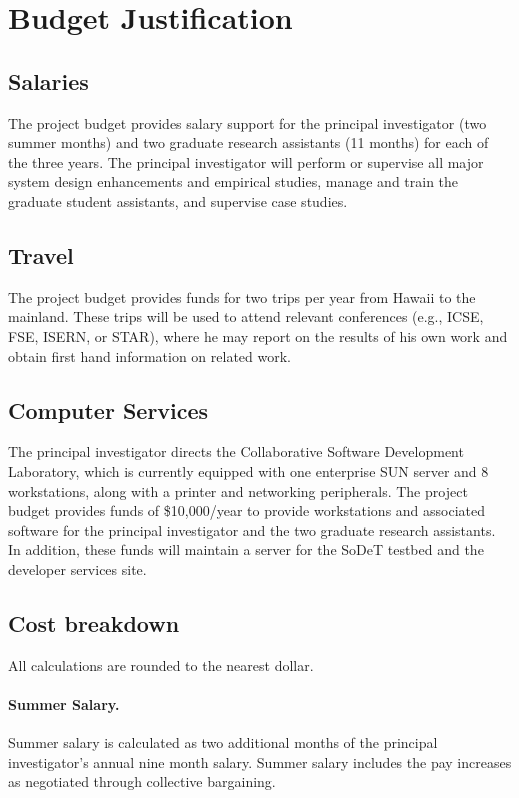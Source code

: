 \documentclass[11pt]{article}
\begin{document}
\pagestyle{empty}
\section*{Budget Justification}

\subsection*{Salaries}

The project budget provides salary support for the principal investigator
(two summer months) and two graduate research
assistants (11 months) for each of the three years.  The principal
investigator will perform or supervise all major system design enhancements
and empirical studies, manage and train the graduate student
assistants, and supervise case studies. 

\subsection*{Travel}

The project budget provides funds for two trips per year from Hawaii to the
mainland.  These trips will be used to attend
relevant conferences (e.g., ICSE, FSE, ISERN, or STAR), where
he may report on the results of his own work and obtain first hand
information on related work. 

\subsection*{Computer Services}

The principal investigator directs the Collaborative Software Development
Laboratory, which is currently equipped with one enterprise SUN server and
8 workstations, along with a printer and networking
peripherals.  The project budget provides funds of \$10,000/year to 
provide workstations and associated software for the principal investigator and 
the two graduate research assistants. In addition, these funds will maintain 
a server for the SoDeT testbed and the developer services site. 

\subsection*{Cost breakdown}
\label{cost-breakdown}

All calculations are rounded to the nearest dollar.

\paragraph{Summer Salary.}  
Summer salary is calculated as two additional months of the principal
investigator's annual nine month salary.  Summer salary includes the pay
increases as negotiated through collective bargaining. 
 
\end{document}
